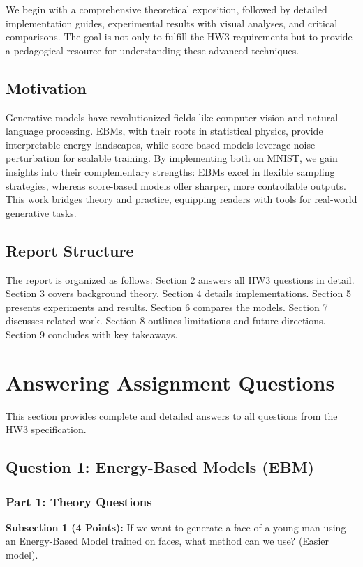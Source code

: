 \documentclass[a4paper,12pt]{article}
\begin{document}
We begin with a comprehensive theoretical exposition, followed by detailed implementation guides, experimental results with visual analyses, and critical comparisons. The goal is not only to fulfill the HW3 requirements but to provide a pedagogical resource for understanding these advanced techniques.

\subsection{Motivation}
Generative models have revolutionized fields like computer vision and natural language processing. EBMs, with their roots in statistical physics, provide interpretable energy landscapes, while score-based models leverage noise perturbation for scalable training. By implementing both on MNIST, we gain insights into their complementary strengths: EBMs excel in flexible sampling strategies, whereas score-based models offer sharper, more controllable outputs. This work bridges theory and practice, equipping readers with tools for real-world generative tasks.

\subsection{Report Structure}
The report is organized as follows: Section 2 answers all HW3 questions in detail. Section 3 covers background theory. Section 4 details implementations. Section 5 presents experiments and results. Section 6 compares the models. Section 7 discusses related work. Section 8 outlines limitations and future directions. Section 9 concludes with key takeaways.

\section{Answering Assignment Questions}
This section provides complete and detailed answers to all questions from the HW3 specification.

\subsection{Question 1: Energy-Based Models (EBM)}

\subsubsection{Part 1: Theory Questions}

\textbf{Subsection 1 (4 Points):} If we want to generate a face of a young man using an Energy-Based Model trained on faces, what method can we use? (Easier model).
\end{document}
